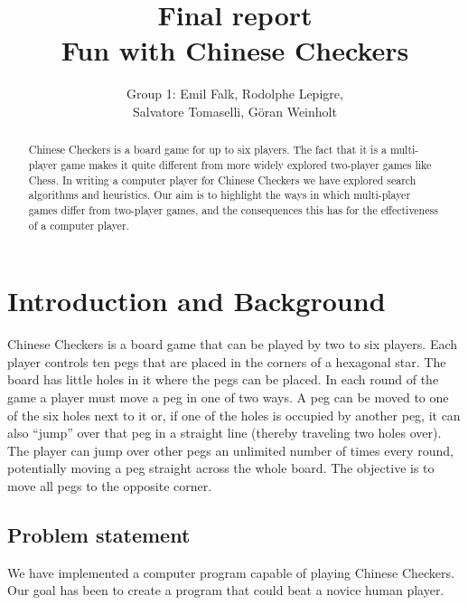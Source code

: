 \documentclass[a4paper,11pt]{article}
\begin{document}
\title{Final report\\Fun with Chinese Checkers}
\author{Group 1: Emil Falk, Rodolphe Lepigre,\\
        Salvatore Tomaselli, G\"oran Weinholt}
\maketitle
\begin{abstract}%
Chinese Checkers is a board game for up to six players. The fact that
it is a multi-player game makes it quite different from more widely
explored two-player games like Chess. In writing a computer player for
Chinese Checkers we have explored search algorithms and heuristics.
Our aim is to highlight the ways in which multi-player games differ
from two-player games, and the consequences this has for the
effectiveness of a computer player.
\end{abstract}

\section{Introduction and Background}
Chinese Checkers is a board game that can be played by two to six players.
Each player controls ten pegs that are placed in the corners of a
hexagonal star. The board has little holes in it where the pegs can be
placed. In each round of the game a player must move a peg in one of
two ways. A peg can be moved to one of the six holes next to it or, if
one of the holes is occupied by another peg, it can also ``jump'' over
that peg in a straight line (thereby traveling two holes over). The
player can jump over other pegs an unlimited number of times every
round, potentially moving a peg straight across the whole board. The
objective is to move all pegs to the opposite corner.

\subsection{Problem statement}
We have implemented a computer program capable of playing Chinese
Checkers. Our goal has been to create a program that could beat a
novice human player.
\end{document}
